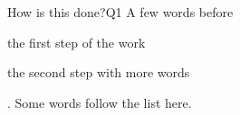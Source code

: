 \documentclass{article}
\begin{document}
\begin{question}{How is this done?}{Q1}
  A few words before
  \begin{steps}
    \item the first step of the work
    \item the second step with more words
  \end{steps}.
  Some words follow the list here.
\end{question}
\gdef\SatexReachedEnd{}
\end{document}
